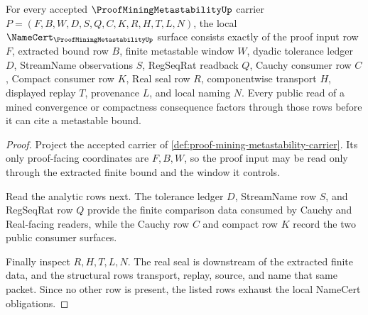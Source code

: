 \begin{theorem}
\label{thm:proof-mining-metastability-namecert-obligations}
For every accepted $\ProofMiningMetastabilityUp$ carrier $P=(F,B,W,D,S,Q,C,K,R,H,T,L,N)$, the local $\NameCert_{\ProofMiningMetastabilityUp}$ surface consists exactly of the proof input row $F$, extracted bound row $B$, finite metastable window $W$, dyadic tolerance ledger $D$, StreamName observations $S$, RegSeqRat readback $Q$, Cauchy consumer row $C$, Compact consumer row $K$, Real seal row $R$, componentwise transport $H$, displayed replay $T$, provenance $L$, and local naming $N$. Every public read of a mined convergence or compactness consequence factors through those rows before it can cite a metastable bound.
\end{theorem}
\begin{proof}
Project the accepted carrier of \autoref{def:proof-mining-metastability-carrier}. Its only proof-facing coordinates are $F,B,W$, so the proof input may be read only through the extracted finite bound and the window it controls.

Read the analytic rows next. The tolerance ledger $D$, StreamName row $S$, and RegSeqRat row $Q$ provide the finite comparison data consumed by Cauchy and Real-facing readers, while the Cauchy row $C$ and compact row $K$ record the two public consumer surfaces.

Finally inspect $R,H,T,L,N$. The real seal is downstream of the extracted finite data, and the structural rows transport, replay, source, and name that same packet. Since no other row is present, the listed rows exhaust the local NameCert obligations.
\end{proof}

